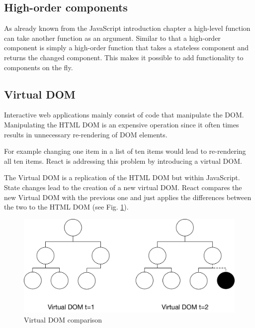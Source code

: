 \subsection{High-order components}

As already known from the JavaScript introduction chapter
a high-level function can take another function as an argument.
Similar to that a high-order component is simply a high-order function
that takes a stateless component and returns the changed component. 
This makes it possible to add functionality to components on the fly. 








\subsection{Virtual DOM}

Interactive web applications mainly consist of code that manipulate the DOM. 
Manipulating the HTML DOM is an expensive operation
since it often times results in unnecessary re-rendering of DOM elements.

For example changing one item in a list of ten items would lead to re-rendering all ten items.
React is addressing this problem by introducing a virtual DOM. 

The Virtual DOM is a replication of the HTML DOM but within JavaScript.
State changes lead to the creation of a new virtual DOM. React compares the new Virtual DOM with the previous one 
and just applies the differences between the two to the HTML DOM  (see Fig. \ref{fig:VirtualDom}).

\begin{figure}[H]
	\centering
	\includegraphics[width=0.8\linewidth]{bilder/grundlagen/VirtualDom.png}
	\caption{Virtual DOM comparison}
	\label{fig:VirtualDom}
\end{figure}

